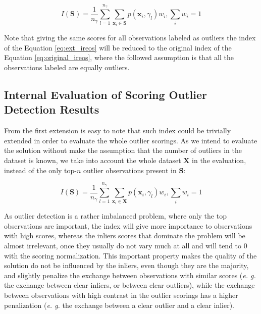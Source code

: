 \begin{equation}
I(\mathbf{S}) = \frac{1}{n_{\gamma}} \sum_{l = 1}^{n_{\gamma}}  \sum_{\mathbf{x}_i \in \mathbf{S}} p(\mathbf{x}_i, \gamma_l) w_i, \sum_i w_i = 1
\label{eq:ext_ireos}
\end{equation}

Note that giving the same scores for all observations labeled as outliers the index of the Equation \ref{eq:ext_ireos} will be reduced to the original index of the Equation \ref{eq:original_ireos}, where the followed assumption is that all the observations labeled are equally outliers.

\subsection{Internal Evaluation of Scoring Outlier Detection Results}
From the first extension is easy to note that such index could be trivially extended in order to evaluate the whole outlier scorings. As we intend to evaluate the solution without make the assumption that the number of outliers in the dataset is known, we take into account the whole dataset $\mathbf{X}$ in the evaluation, instead of the only top-$n$ outlier observations present in $\mathbf{S}$:

\begin{equation}
I(\mathbf{S}) = \frac{1}{n_{\gamma}} \sum_{l = 1}^{n_{\gamma}} \sum_{\mathbf{x}_i \in \mathbf{X}} p(\mathbf{x}_i, \gamma_l) w_i, \sum_i w_i = 1
\label{eq:compl_ext_ireos}
\end{equation}

As outlier detection is a rather imbalanced problem, where only the top observations are important, the index will give more importance to observations with high scores, whereas the inliers scores that dominate the problem will be almost irrelevant, once they usually do not vary much at all and will tend to 0 with the scoring normalization. This important property makes the quality of the solution do not be influenced by the inliers, even though they are the majority, and slightly penalize the exchange between observations with similar scores (\textit{e. g.} the exchange between clear inliers, or between clear outliers), while the exchange between observations with high contrast in the outlier scorings has a higher penalization (\textit{e. g.} the exchange between a clear outlier and a clear inlier).

